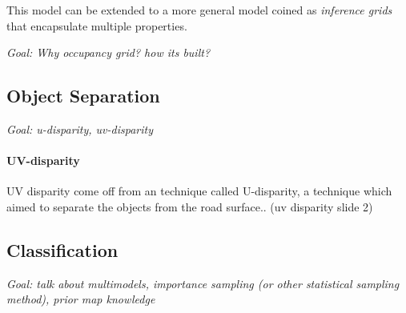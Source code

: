 This model can be extended to a more general model coined as \textit{inference grids} that encapsulate multiple properties\cite{Elfes:1989:OGP:916528}.

\textit{Goal: Why occupancy grid? how its built? }

\subsection{Object Separation}

\textit{Goal: u-disparity, uv-disparity}

\paragraph*{UV-disparity} 

UV disparity come off from an technique called U-disparity, a technique which aimed to separate the objects from the road surface.. (uv disparity slide 2)


\subsection{Classification}

\textit{Goal: talk about multimodels, importance sampling (or other statistical sampling method), prior map knowledge }

